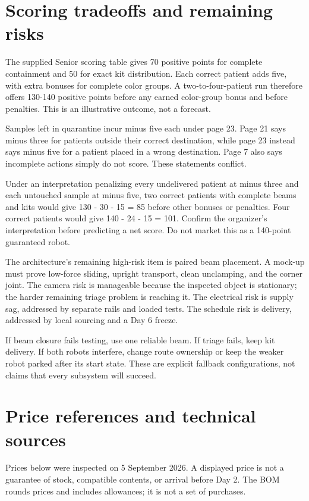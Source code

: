 \documentclass[10pt,a4paper]{article}
\begin{document}
\section{Scoring tradeoffs and remaining risks}
The supplied Senior scoring table gives 70 positive points for complete containment and 50 for exact kit distribution. Each correct patient adds five, with extra bonuses for complete color groups. A two-to-four-patient run therefore offers 130-140 positive points before any earned color-group bonus and before penalties. This is an illustrative outcome, not a forecast.

Samples left in quarantine incur minus five each under page 23. Page 21 says minus three for patients outside their correct destination, while page 23 instead says minus five for a patient placed in a wrong destination. Page 7 also says incomplete actions simply do not score. These statements conflict.

Under an interpretation penalizing every undelivered patient at minus three and each untouched sample at minus five, two correct patients with complete beams and kits would give 130 - 30 - 15 = 85 before other bonuses or penalties. Four correct patients would give 140 - 24 - 15 = 101. Confirm the organizer's interpretation before predicting a net score. Do not market this as a 140-point guaranteed robot.

The architecture's remaining high-risk item is paired beam placement. A mock-up must prove low-force sliding, upright transport, clean unclamping, and the corner joint. The camera risk is manageable because the inspected object is stationary; the harder remaining triage problem is reaching it. The electrical risk is supply sag, addressed by separate rails and loaded tests. The schedule risk is delivery, addressed by local sourcing and a Day 6 freeze.

If beam closure fails testing, use one reliable beam. If triage fails, keep kit delivery. If both robots interfere, change route ownership or keep the weaker robot parked after its start state. These are explicit fallback configurations, not claims that every subsystem will succeed.

\section{Price references and technical sources}
Prices below were inspected on 5 September 2026. A displayed price is not a guarantee of stock, compatible contents, or arrival before Day 2. The BOM rounds prices and includes allowances; it is not a set of purchases.
\end{document}
